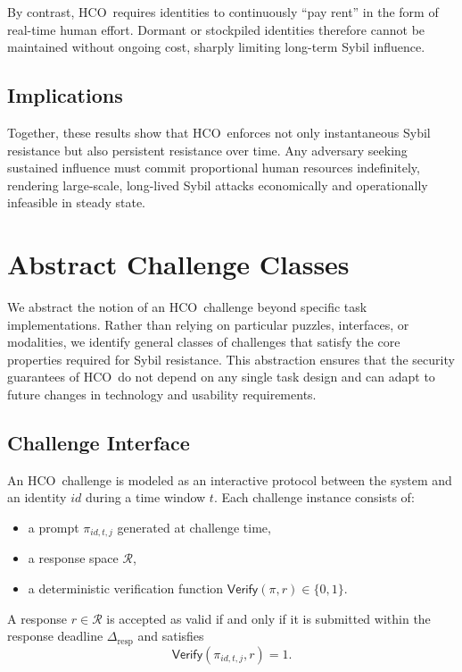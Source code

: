 \documentclass[11pt]{article}
\newcommand{\HCO}{HCO\xspace}
\begin{document}
By contrast, \HCO\ requires identities to continuously ``pay rent'' in the form of real-time human effort. Dormant or stockpiled identities therefore cannot be maintained without ongoing cost, sharply limiting long-term Sybil influence.

\subsection{Implications}

Together, these results show that \HCO\ enforces not only instantaneous Sybil resistance but also persistent resistance over time. Any adversary seeking sustained influence must commit proportional human resources indefinitely, rendering large-scale, long-lived Sybil attacks economically and operationally infeasible in steady state.

	
\section{Abstract Challenge Classes}

We abstract the notion of an \HCO\ challenge beyond specific task implementations. Rather than relying on particular puzzles, interfaces, or modalities, we identify general classes of challenges that satisfy the core properties required for Sybil resistance. This abstraction ensures that the security guarantees of \HCO\ do not depend on any single task design and can adapt to future changes in technology and usability requirements.

\subsection{Challenge Interface}

An \HCO\ challenge is modeled as an interactive protocol between the system and an identity $id$ during a time window $t$. Each challenge instance consists of:
\begin{itemize}
	\item a prompt $\pi_{id,t,j}$ generated at challenge time,
	\item a response space $\mathcal{R}$,
	\item a deterministic verification function $\mathsf{Verify}(\pi, r) \in \{0,1\}$.
\end{itemize}

A response $r \in \mathcal{R}$ is accepted as valid if and only if it is submitted within the response deadline $\Delta_{\mathrm{resp}}$ and satisfies
\[
\mathsf{Verify}(\pi_{id,t,j}, r) = 1.
\]
\end{document}
